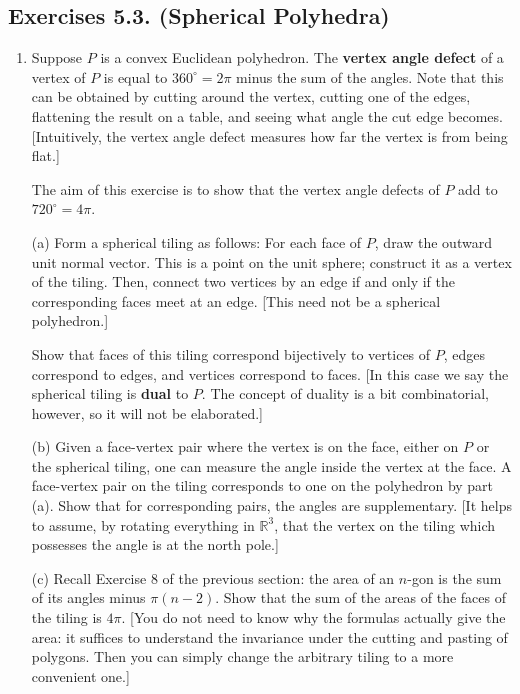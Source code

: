\documentclass[leqno]{book}
\begin{document}
\subsection*{Exercises 5.3. (Spherical Polyhedra)} %
\begin{enumerate}
\item Suppose $P$ is a convex Euclidean polyhedron.  The \textbf{vertex angle defect} of a vertex of $P$ is equal to $360^\circ=2\pi$ minus the sum of the angles.  Note that this can be obtained by cutting around the vertex, cutting one of the edges, flattening the result on a table, and seeing what angle the cut edge becomes.  [Intuitively, the vertex angle defect measures how far the vertex is from being flat.]

The aim of this exercise is to show that the vertex angle defects of $P$ add to $720^\circ=4\pi$.

(a) Form a spherical tiling as follows: For each face of $P$, draw the outward unit normal vector.  This is a point on the unit sphere; construct it as a vertex of the tiling.  Then, connect two vertices by an edge if and only if the corresponding faces meet at an edge. [This need not be a spherical polyhedron.]

Show that faces of this tiling correspond bijectively to vertices of $P$, edges correspond to edges, and vertices correspond to faces.  [In this case we say the spherical tiling is \textbf{dual} to $P$.  The concept of duality is a bit combinatorial, however, so it will not be elaborated.]

(b) Given a face-vertex pair where the vertex is on the face, either on $P$ or the spherical tiling, one can measure the angle inside the vertex at the face.  A face-vertex pair on the tiling corresponds to one on the polyhedron by part (a).  Show that for corresponding pairs, the angles are supplementary.  [It helps to assume, by rotating everything in $\mathbb R^3$, that the vertex on the tiling which possesses the angle is at the north pole.]

(c) Recall Exercise 8 of the previous section: the area of an $n$-gon is the sum of its angles minus $\pi(n-2)$.  Show that the sum of the areas of the faces of the tiling is $4\pi$.  [You do not need to know why the formulas actually give the area: it suffices to understand the invariance under the cutting and pasting of polygons.  Then you can simply change the arbitrary tiling to a more convenient one.] %


\end{enumerate}
\end{document}
